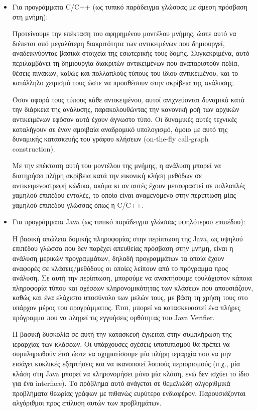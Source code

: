 \begin{itemize}
\item Για προγράμματα {\en C/C++} (ως τυπικό παράδειγμα γλώσσας με
  άμεση πρόσβαση στη μνήμη):

  Προτείνουμε την επέκταση του αφηρημένου μοντέλου μνήμης, ώστε αυτό
  να διέπεται από μεγαλύτερη διακριτότητα των αντικειμένων που
  δημιουργεί, αναδεικνύοντας βασικά στοιχεία της εσωτερικής τους
  δομής.  Συγκεκριμένα, αυτό περιλαμβάνει τη δημιουργία διακριτών
  αντικειμένων που αναπαριστούν πεδία, θέσεις πινάκων, καθώς και
  πολλαπλούς τύπους του ίδιου αντικειμένου, και το κατάλληλο χειρισμό
  τους ώστε να προσθέσουν στην ακρίβεια της ανάλυσης.

  Όσον αφορά τους τύπους κάθε αντικειμένου, αυτοί ανιχνεύονται
  δυναμικά κατά την διάρκεια της ανάλυσης, παρακολουθώντας την
  κανονική ροή των αρχικών αντικειμένων εφόσον αυτά έχουν άγνωστο
  τύπο.  Οι δυναμικές αυτές τεχνικές καταλήγουν σε έναν αμοιβαία
  αναδρομικό υπολογισμό, όμοιο με αυτό της δυναμικής κατασκευής του
  γράφου κλήσεων ({\en on-the-fly call-graph construction}).

  Με την επέκταση αυτή του μοντέλου της μνήμης, η ανάλυση μπορεί να
  διατηρήσει πλήρη ακρίβεια κατά την εικονική κλήση μεθόδων σε
  αντικειμενοστρεφή κώδικα, ακόμα κι αν αυτές έχουν μεταφραστεί σε
  πολλαπλές χαμηλού επιπέδου εντολές, το οποίο είναι αναμενόμενο στην
  περίπτωση μίας χαμηλού επιπέδου γλώσσας όπως η {\en C/C++}.
\item Για προγράμματα {\en Java} (ως τυπικό παράδειγμα γλώσσας
  υψηλότερου επιπέδου):

  Η βασική απώλεια δομικής πληροφορίας στην περίπτωση της {\en Java},
  ως υψηλού επιπέδου γλώσσα που δεν παρέχει απευθείας πρόσβαση στην
  μνήμη, είναι η ανάλυση μερικών προγραμμάτων, δηλαδή προγραμμάτων τα
  οποία έχουν αναφορές σε κλάσεις/μεθόδους οι οποίες λείπουν από το
  πρόγραμμα προς ανάλυση.  Σε αυτή την περίπτωση, μπορούμε να
  ανακτήσουμε τουλάχιστον κάποια πληροφορία τύπου και σχέσεων
  κληρονομικότητας των κλάσεων που απουσιάζουν, καθώς και ένα ελάχιστο
  υποσύνολο των μελών τους, με βάση τη χρήση τους στο υπάρχον μέρος
  του προγράμματος.  Έτσι, μπορεί να κατασκευαστεί ένα πλήρες
  πρόγραμμα που να πληρεί τις εγγυήσεις ορθότητας του {\en Java
    Verifier}.

  Η βασική δυσκολία σε αυτή την κατασκευή έγκειται στην συμπλήρωση της
  ιεραρχίας των κλάσεων.  Οι υπάρχουσες σχέσεις υποτυπισμού θα πρέπει
  να συμπληρωθούν έτσι ώστε να σχηματίσουμε μία πλήρη ιεραρχία που να
  μην εισάγει κυκλικές εξαρτήσεις και να ικανοποιεί λοιπούς
  περιορισμούς (π.χ., μία κλάση στη {\en Java} μπορεί να κληρονομήσει
  μόνο μία κλάση, ενώ δεν ισχύει το ίδιο για ένα {\en interface}).  Το
  πρόβλημα αυτό ανάγεται σε θεμελιώδη αλγοριθμικά προβλήματα θεωρίας
  γράφων με πιθανώς ευρύτερο ενδιαφέρον.  Παρουσιάζονται αλγόριθμοι
  προς επίλυση αυτών των προβλημάτων.


\end{itemize}
